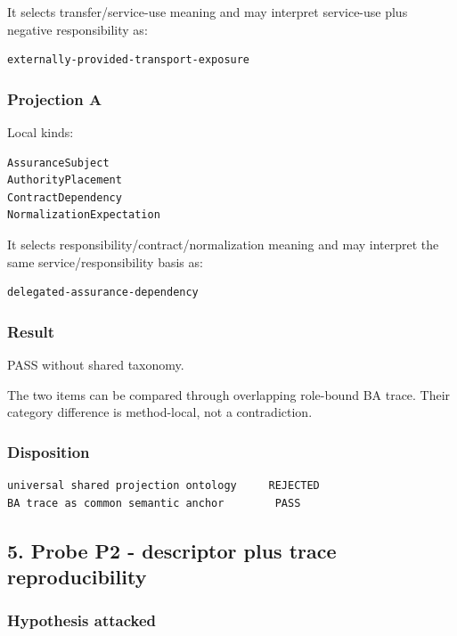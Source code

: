 \documentclass[11pt,a4paper]{article}
\begin{document}
It selects transfer/service-use meaning and may interpret service-use
plus negative responsibility as:

\begin{verbatim}
externally-provided-transport-exposure
\end{verbatim}

\subsubsection{Projection A}\label{projection-a}

Local kinds:

\begin{verbatim}
AssuranceSubject
AuthorityPlacement
ContractDependency
NormalizationExpectation
\end{verbatim}

It selects responsibility/contract/normalization meaning and may
interpret the same service/responsibility basis as:

\begin{verbatim}
delegated-assurance-dependency
\end{verbatim}

\subsubsection{Result}\label{result}

PASS without shared taxonomy.

The two items can be compared through overlapping role-bound BA trace.
Their category difference is method-local, not a contradiction.

\subsubsection{Disposition}\label{disposition}

\begin{verbatim}
universal shared projection ontology     REJECTED
BA trace as common semantic anchor        PASS
\end{verbatim}

\subsection{5. Probe P2 - descriptor plus trace
reproducibility}\label{5-probe-p2---descriptor-plus-trace-reproducibility}

\subsubsection{Hypothesis attacked}\label{hypothesis-attacked-1}
\end{document}

